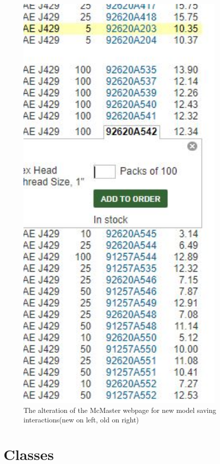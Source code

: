 \documentclass[12pt, letterpaper]{article}
\begin{document}
\begin{figure}[H]
\begin{minipage}{0.2\textwidth}
        \includegraphics[width=0.9\textwidth]{Figures/webBrowserOld.JPG}
    \end{minipage}
    \caption{The alteration of the McMaster webpage for new model saving interactions(new on left, old on right)}
\end{figure}
\newpage
\section{Classes}
\end{document}
